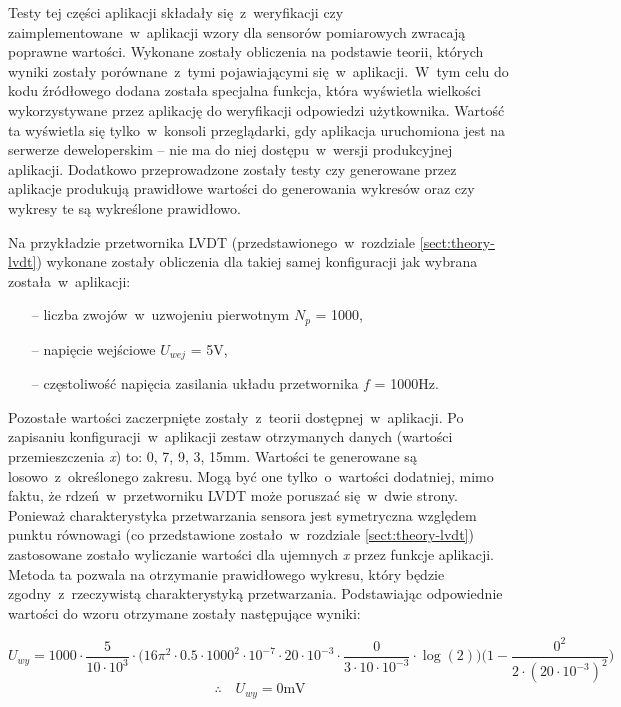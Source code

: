 Testy tej części aplikacji składały się~z~weryfikacji czy zaimplementowane~w~aplikacji wzory dla
sensorów pomiarowych zwracają poprawne wartości. Wykonane zostały obliczenia na podstawie teorii,
których wyniki zostały porównane~z~tymi pojawiającymi się~w~aplikacji.~W~tym celu do kodu źródłowego
dodana została specjalna funkcja, która wyświetla wielkości wykorzystywane przez aplikację do
weryfikacji odpowiedzi użytkownika. Wartość ta wyświetla się tylko~w~konsoli przeglądarki, gdy
aplikacja uruchomiona jest na serwerze deweloperskim -- nie ma do niej dostępu~w~wersji produkcyjnej
aplikacji. Dodatkowo przeprowadzone zostały testy czy generowane przez aplikacje produkują
prawidłowe wartości do generowania wykresów oraz czy wykresy te są wykreślone prawidłowo.

Na przykładzie przetwornika LVDT (przedstawionego~w~rozdziale \ref{sect:theory-lvdt}) wykonane
zostały obliczenia dla takiej samej konfiguracji jak wybrana została~w~aplikacji:
\begin{itemize}
  \item [--]  liczba zwojów~w~uzwojeniu pierwotnym $N_p$ = 1000,
  \item [--]  napięcie wejściowe $U_{wej}$ = 5V,
  \item [--]  częstoliwość napięcia zasilania układu przetwornika $f$ = 1000Hz.
\end{itemize}
Pozostałe wartości zaczerpnięte zostały~z~teorii dostępnej~w~aplikacji. Po zapisaniu
konfiguracji~w~aplikacji zestaw otrzymanych danych (wartości przemieszczenia \textit{\textrm{x}})
to: 0, 7, 9, 3, 15mm. Wartości te generowane są losowo~z~określonego zakresu. Mogą być one
tylko~o~wartości dodatniej, mimo faktu, że rdzeń~w~przetworniku LVDT może poruszać się~w~dwie
strony. Ponieważ charakterystyka przetwarzania sensora jest symetryczna względem punktu równowagi
(co przedstawione zostało~w~rozdziale \ref{sect:theory-lvdt}) zastosowane zostało wyliczanie
wartości dla ujemnych \textit{\textrm{x}} przez funkcje aplikacji. Metoda ta pozwala na otrzymanie
prawidłowego wykresu, który będzie zgodny~z~rzeczywistą charakterystyką przetwarzania. Podstawiając
odpowiednie wartości do wzoru otrzymane zostały następujące wyniki:

\begin{equation*}
  U_{wy} =1000\cdot \frac{5}{10\cdot 10^3}\cdot\bigg(16\pi^2\cdot 0.5\cdot 1000^2\cdot
  10^{-7}\cdot 20\cdot 10^{-3}\cdot\frac{0}{3\cdot 10\cdot 10^{-3}}\cdot\log{(2)}\bigg)
  \bigg(1-\frac{0^2}{2\cdot (20\cdot 10^{-3})^2}\bigg)
\end{equation*}
\begin{equation*}
  \therefore\quad U_{wy} = 0\text{mV}
\end{equation*}

